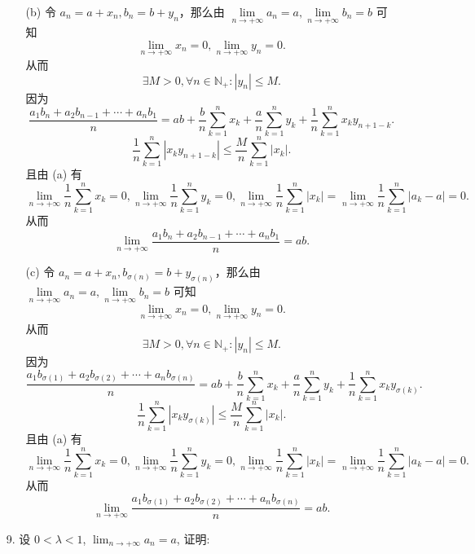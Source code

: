 \begin{enumerate}
\begin{solution}
\begin{enumerate}
        \item[(b)]
        令 $a_{n}=a+x_{n},b_{n}=b+y_{n}$，那么由 $\underset{n\to+\infty}{\lim}a_{n}=a,\underset{n\to+\infty}{\lim}b_{n}=b$ 可知
        \[
        \lim_{n \to +\infty}x_{n}=0,\lim_{n \to +\infty}y_{n}=0.
        \]
        从而
        \[
        \exists M>0,\forall n\in\mathbb{N}_{+}: \left|y_{n}\right|\leq M.
        \]
        因为
        \[
        \frac{a_{1}b_{n}+a_{2}b_{n-1}+\cdots+a_{n}b_{1}}{n}=ab+\frac{b}{n} \sum_{k=1}^{n}x_{k}+\frac{a}{n} \sum_{k=1}^{n} y_{k}+\frac{1}{n} \sum_{k=1}^{n}x_{k}y_{n+1-k}.
        \]
        \[
        \frac{1}{n}\sum_{k=1}^{n}\left|x_{k}y_{n+1-k}\right|\leq \frac{M}{n}\sum_{k=1}^{n}\left|x_{k}\right|.
        \]
        且由 (a) 有
        \[
        \lim_{n \to +\infty}\frac{1}{n}\sum_{k=1}^{n}x_{k}=0,
        \lim_{n \to +\infty}\frac{1}{n}\sum_{k=1}^{n}y_{k}=0,
        \lim_{n \to +\infty}\frac{1}{n}\sum_{k=1}^{n}\left|x_{k}\right|=
        \lim_{n \to +\infty}\frac{1}{n}\sum_{k=1}^{n}\left|a_{k}-a\right|=0.
        \]
        从而
        \[
        \lim_{n \to +\infty}\frac{a_{1}b_{n}+a_{2}b_{n-1}+\cdots+a_{n}b_{1}}{n}=ab. 
        \]

        \item[(c)]
        令 $a_{n}=a+x_{n},b_{\sigma(n)}=b+y_{\sigma(n)}$，那么由 $\underset{n\to+\infty}{\lim}a_{n}=a,\underset{n\to+\infty}{\lim}b_{n}=b$ 可知
        \[
        \lim_{n \to +\infty}x_{n}=0,\lim_{n \to +\infty}y_{n}=0.
        \]
        从而
        \[
        \exists M>0,\forall n\in\mathbb{N}_{+}: \left|y_{n}\right|\leq M.
        \]
        因为
        \[
        \frac{a_{1}b_{\sigma(1)}+a_{2}b_{\sigma(2)}+\cdots+a_{n}b_{\sigma(n)}}{n}=ab+\frac{b}{n} \sum_{k=1}^{n}x_{k}+\frac{a}{n} \sum_{k=1}^{n} y_{k}+\frac{1}{n} \sum_{k=1}^{n}x_{k}y_{\sigma(k)}.
        \]
        \[
        \frac{1}{n}\sum_{k=1}^{n}\left|x_{k}y_{\sigma(k)}\right|\leq \frac{M}{n}\sum_{k=1}^{n}\left|x_{k}\right|.
        \]
        且由 (a) 有
        \[
        \lim_{n \to +\infty}\frac{1}{n}\sum_{k=1}^{n}x_{k}=0,
        \lim_{n \to +\infty}\frac{1}{n}\sum_{k=1}^{n}y_{k}=0,
        \lim_{n \to +\infty}\frac{1}{n}\sum_{k=1}^{n}\left|x_{k}\right|=
        \lim_{n \to +\infty}\frac{1}{n}\sum_{k=1}^{n}\left|a_{k}-a\right|=0.
        \]
        从而
        \[
        \lim_{n \to +\infty}\frac{a_{1}b_{\sigma(1)}+a_{2}b_{\sigma(2)}+\cdots+a_{n}b_{\sigma(n)}}{n}=ab. 
        \]
        \end{enumerate}
    \end{solution}

    \item[9.]设 $0 < \lambda < 1$, $\displaystyle \lim_{n \to +\infty} a_{n} = a$, 证明:


\end{enumerate}

